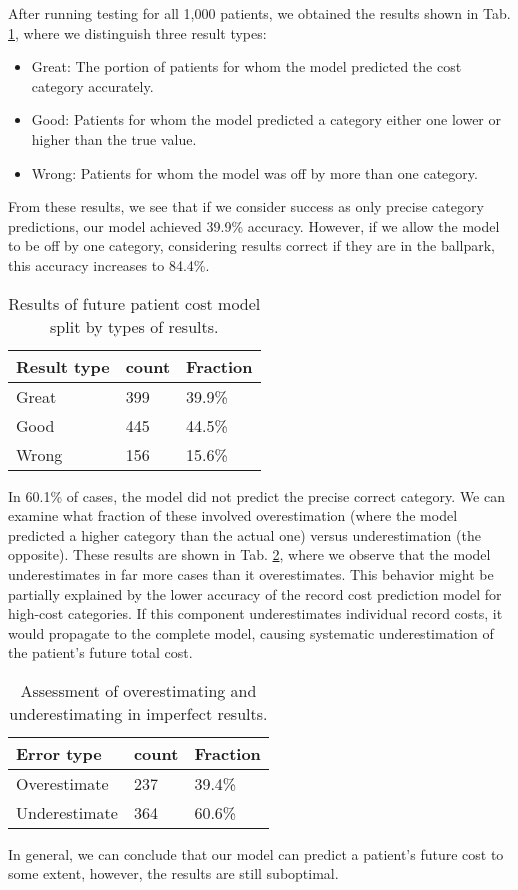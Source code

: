 After running testing for all 1,000 patients, we obtained the results shown in Tab. \ref{tab:testRes}, where we distinguish three result types:

\begin{itemize}
	\item Great: The portion of patients for whom the model predicted the cost category accurately.
	\item Good: Patients for whom the model predicted a category either one lower or higher than the true value.
	\item Wrong: Patients for whom the model was off by more than one category.
\end{itemize}

From these results, we see that if we consider success as only precise category predictions, our model achieved 39.9\% accuracy. However, if we allow the model to be off by one category, considering results correct if they are in the ballpark, this accuracy increases to 84.4\%.


\begin{table}[!h]
	\centering
	\begin{tabular}{|l|l|l|}
		\hline
		Result type & count & Fraction \\ \hline
		Great & 399 & 39.9\% \\ \hline
		Good  & 445 & 44.5\% \\ \hline
		Wrong & 156 & 15.6\% \\ \hline
	\end{tabular}
	\caption{Results of future patient cost model split by types of results.}
	\label{tab:testRes}
\end{table}

In 60.1\% of cases, the model did not predict the precise correct category. We can examine what fraction of these involved overestimation (where the model predicted a higher category than the actual one) versus underestimation (the opposite). These results are shown in Tab. \ref{tab:testRes2}, where we observe that the model underestimates in far more cases than it overestimates. This behavior might be partially explained by the lower accuracy of the record cost prediction model for high-cost categories. If this component underestimates individual record costs, it would propagate to the complete model, causing systematic underestimation of the patient’s future total cost.
\\

\begin{table}[!h]
	\centering
	\begin{tabular}{|l|l|l|}
		\hline
		Error type & count & Fraction \\ \hline
		Overestimate   & 237 & 39.4\% \\ \hline
		Underestimate  & 364 & 60.6\% \\ \hline
	\end{tabular}
	\caption{Assessment of overestimating and underestimating in imperfect results.}
	\label{tab:testRes2}
\end{table}

In general, we can conclude that our model can predict a patient’s future cost to some extent, however, the results are still suboptimal.